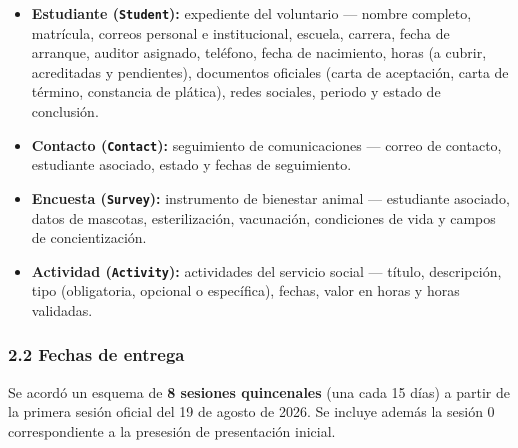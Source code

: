 \documentclass[
]{article}
\providecommand{\tightlist}{%
  \setlength{\itemsep}{0pt}\setlength{\parskip}{0pt}}
\begin{document}
\begin{itemize}
\tightlist
\item
  \textbf{Estudiante (\texttt{Student}):} expediente del voluntario ---
  nombre completo, matrícula, correos personal e institucional, escuela,
  carrera, fecha de arranque, auditor asignado, teléfono, fecha de
  nacimiento, horas (a cubrir, acreditadas y pendientes), documentos
  oficiales (carta de aceptación, carta de término, constancia de
  plática), redes sociales, periodo y estado de conclusión.
\item
  \textbf{Contacto (\texttt{Contact}):} seguimiento de comunicaciones
  --- correo de contacto, estudiante asociado, estado y fechas de
  seguimiento.
\item
  \textbf{Encuesta (\texttt{Survey}):} instrumento de bienestar animal
  --- estudiante asociado, datos de mascotas, esterilización,
  vacunación, condiciones de vida y campos de concientización.
\item
  \textbf{Actividad (\texttt{Activity}):} actividades del servicio
  social --- título, descripción, tipo (obligatoria, opcional o
  específica), fechas, valor en horas y horas validadas.
\end{itemize}

\subsubsection{2.2 Fechas de entrega}\label{fechas-de-entrega}

Se acordó un esquema de \textbf{8 sesiones quincenales} (una cada 15
días) a partir de la primera sesión oficial del 19 de agosto de 2026. Se
incluye además la sesión 0 correspondiente a la presesión de
presentación inicial.
\end{document}
